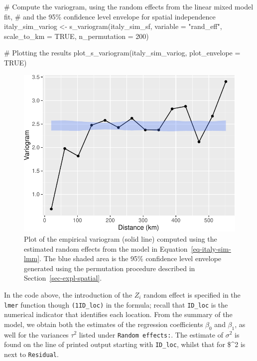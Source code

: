 \documentclass[
  letterpaper,
]{krantz}
\newenvironment{Shaded}{\begin{snugshade}}{\end{snugshade}}
\newcommand{\AttributeTok}[1]{\textcolor[rgb]{0.40,0.45,0.13}{#1}}
\newcommand{\CommentTok}[1]{\textcolor[rgb]{0.37,0.37,0.37}{#1}}
\newcommand{\ConstantTok}[1]{\textcolor[rgb]{0.56,0.35,0.01}{#1}}
\newcommand{\DecValTok}[1]{\textcolor[rgb]{0.68,0.00,0.00}{#1}}
\newcommand{\FunctionTok}[1]{\textcolor[rgb]{0.28,0.35,0.67}{#1}}
\newcommand{\NormalTok}[1]{\textcolor[rgb]{0.00,0.23,0.31}{#1}}
\newcommand{\OtherTok}[1]{\textcolor[rgb]{0.00,0.23,0.31}{#1}}
\newcommand{\StringTok}[1]{\textcolor[rgb]{0.13,0.47,0.30}{#1}}
\begin{document}
\begin{Shaded}
\begin{Highlighting}[]
\CommentTok{\# Compute the variogram, using the random effects from the linear mixed model fit,}
\CommentTok{\# and the 95\% confidence level envelope for spatial independence}
\NormalTok{italy\_sim\_variog }\OtherTok{\textless{}{-}} \FunctionTok{s\_variogram}\NormalTok{(italy\_sim\_sf, }\AttributeTok{variable =} \StringTok{"rand\_eff"}\NormalTok{, }
                                \AttributeTok{scale\_to\_km =} \ConstantTok{TRUE}\NormalTok{,}
                                \AttributeTok{n\_permutation =} \DecValTok{200}\NormalTok{)}

\CommentTok{\# Plotting the results}
\FunctionTok{plot\_s\_variogram}\NormalTok{(italy\_sim\_variog, }\AttributeTok{plot\_envelope =} \ConstantTok{TRUE}\NormalTok{)}
\end{Highlighting}
\end{Shaded}

\begin{figure}[H]

{\centering \includegraphics{03_model-fitting_files/figure-pdf/fig-italy-sim-variog-1.pdf}

}

\caption{\label{fig-italy-sim-variog}Plot of the empirical variogram
(solid line) computed using the estimated random effects from the model
in Equation~\ref{eq-italy-sim-lmm}. The blue shaded area is the 95\%
confidence level envelope generated using the permutation procedure
described in Section~\ref{sec-expl-spatial}.}

\end{figure}

In the code above, the introduction of the \(Z_i\) random effect is
specified in the \texttt{lmer} function though
\texttt{(1\textbar{}ID\_loc)} in the formula; recall that
\texttt{ID\_loc} is the numerical indicator that identifies each
location. From the summary of the model, we obtain both the estimates of
the regression coefficients \(\beta_{0}\) and \(\beta_{1}\), as well for
the variances \(\tau^2\) listed under \texttt{Random\ effects:}. The
estimate of \(\sigma^2\) is found on the line of printed output starting
with \texttt{ID\_loc}, whilst that for \$\omega\^{}2 is next to
\texttt{Residual}.
\end{document}
